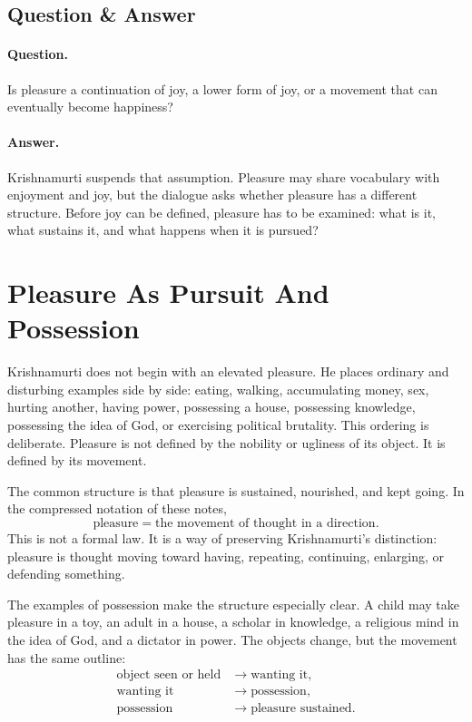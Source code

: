 \subsection{Question \& Answer}

\paragraph{Question.}
Is pleasure a continuation of joy, a lower form of joy, or a movement that can eventually become happiness?

\paragraph{Answer.}
Krishnamurti suspends that assumption. Pleasure may share vocabulary with enjoyment and joy, but the dialogue asks whether pleasure has a different structure. Before joy can be defined, pleasure has to be examined: what is it, what sustains it, and what happens when it is pursued?

\section{Pleasure As Pursuit And Possession}

Krishnamurti does not begin with an elevated pleasure. He places ordinary and disturbing examples side by side: eating, walking, accumulating money, sex, hurting another, having power, possessing a house, possessing knowledge, possessing the idea of God, or exercising political brutality. This ordering is deliberate. Pleasure is not defined by the nobility or ugliness of its object. It is defined by its movement.

The common structure is that pleasure is sustained, nourished, and kept going. In the compressed notation of these notes,
\begin{equation}
\text{pleasure} = \text{the movement of thought in a direction}.
\end{equation}
This is not a formal law. It is a way of preserving Krishnamurti's distinction: pleasure is thought moving toward having, repeating, continuing, enlarging, or defending something.

The examples of possession make the structure especially clear. A child may take pleasure in a toy, an adult in a house, a scholar in knowledge, a religious mind in the idea of God, and a dictator in power. The objects change, but the movement has the same outline:
\begin{align}
\text{object seen or held} &\longrightarrow \text{wanting it},\\
\text{wanting it} &\longrightarrow \text{possession},\\
\text{possession} &\longrightarrow \text{pleasure sustained}.
\end{align}

